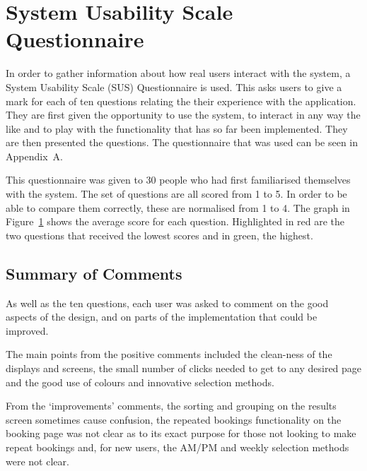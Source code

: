\section{System Usability Scale Questionnaire}
\label{sec:system_usability_scale_questionnaire}

In order to gather information about how real users interact with the system, a
System Usability Scale (SUS) Questionnaire is used. This asks users to give a
mark for each of ten questions relating the their experience with the
application. They are first given the opportunity to use the system, to
interact in any way the like and to play with the functionality that has so far
been implemented. They are then presented the questions. The questionnaire that
was used can be seen in Appendix~A.

This questionnaire was given to 30 people who had first familiarised themselves
with the system. The set of questions are all scored from 1 to 5. In order to
be able to compare them correctly, these are normalised from 1 to 4. The graph
in Figure~\ref{fig:evalGraph} shows the average score for each question.
Highlighted in red are the two questions that received the lowest scores and in
green, the highest.

\begin{figure}[h]
\centering

\caption{}\label{fig:evalGraph}
\end{figure}

\subsection{Summary of Comments}
\label{sub:summary_of_comments}

As well as the ten questions, each user was asked to comment on the good
aspects of the design, and on parts of the implementation that could be
improved.

The main points from the positive comments included the clean-ness of the
displays and screens, the small number of clicks needed to get to any desired
page and the good use of colours and innovative selection methods.

From the `improvements' comments, the sorting and grouping on the results
screen sometimes cause confusion, the repeated bookings functionality on the
booking page was not clear as to its exact purpose for those not looking to
make repeat bookings and, for new users, the AM/PM and weekly selection methods
were not clear.
